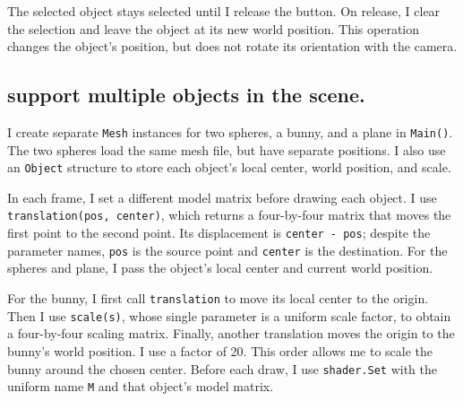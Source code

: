 \documentclass[acmtog]{acmart}
\begin{document}
The selected object stays selected until I release the button. On release, I clear the selection and leave the object at its new world position. This operation changes the object's position, but does not rotate its orientation with the camera.
\subsection{ support multiple objects in the scene.}
I create separate \texttt{Mesh} instances for two spheres, a bunny, and a plane in \texttt{Main()}. The two spheres load the same mesh file, but have separate positions. I also use an \texttt{Object} structure to store each object's local center, world position, and scale.

In each frame, I set a different model matrix before drawing each object. I use \texttt{translation(pos, center)}, which returns a four-by-four matrix that moves the first point to the second point. Its displacement is \texttt{center - pos}; despite the parameter names, \texttt{pos} is the source point and \texttt{center} is the destination. For the spheres and plane, I pass the object's local center and current world position.

For the bunny, I first call \texttt{translation} to move its local center to the origin. Then I use \texttt{scale(s)}, whose single parameter is a uniform scale factor, to obtain a four-by-four scaling matrix. Finally, another translation moves the origin to the bunny's world position. I use a factor of 20. This order allows me to scale the bunny around the chosen center. Before each draw, I use \texttt{shader.Set} with the uniform name \texttt{M} and that object's model matrix.
\end{document}
